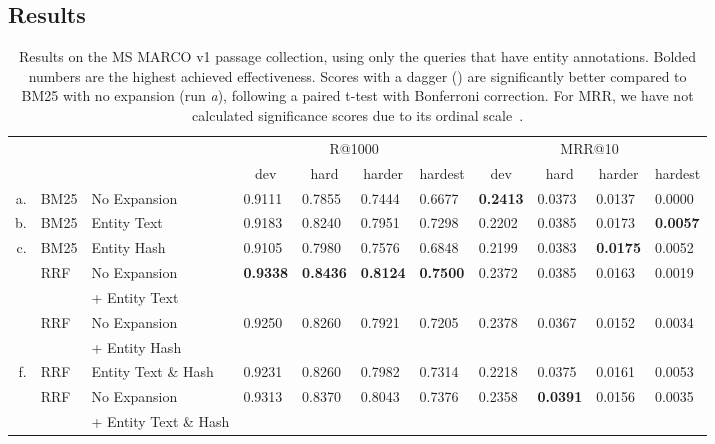 \subsection{Results}
\begin{table}
	\centering
	\caption{Results on the MS MARCO v1 passage collection, using only the queries that have entity annotations. Bolded numbers are the highest achieved effectiveness. Scores with a dagger (\dag) are significantly better compared to BM25 with no expansion (run \emph{a}), following a paired t-test with Bonferroni correction. For MRR, we have not calculated significance scores due to its ordinal scale~\citep{fuhr-mrr}.}
	\tabcolsep=0.11cm
	\begin{tabular}{rll|llll|llll}
		\toprule
		\multirow{2}{*}{}
		& & & \multicolumn{4}{c|}{R@1000} & \multicolumn{4}{c}{MRR@10} \\
		& & & \multicolumn{1}{c}{dev} & \multicolumn{1}{c}{hard} & \multicolumn{1}{c}{harder} & \multicolumn{1}{c|}{hardest} & \multicolumn{1}{c}{dev} & \multicolumn{1}{c}{hard} & \multicolumn{1}{c}{harder} & \multicolumn{1}{c}{hardest} \\
		\midrule
		a. & BM25 & No Expansion                       & 0.9111 & 0.7855 & 0.7444 & 0.6677 & \textbf{0.2413} & 0.0373 & 0.0137 & 0.0000 \\
		b. & BM25 & Entity Text                        & 0.9183 & 0.8240\dag & 0.7951\dag & 0.7298\dag & 0.2202 & 0.0385 & 0.0173 & \textbf{0.0057} \\
		c. & BM25 & Entity Hash                        & 0.9105 & 0.7980 & 0.7576 & 0.6848 & 0.2199 & 0.0383 & \textbf{0.0175} & 0.0052 \\ \midrule
		\multirow{2}{*}{}
		d. & RRF & No Expansion          & \textbf{0.9338}\dag & \textbf{0.8436}\dag & \textbf{0.8124}\dag & \textbf{0.7500}\dag & 0.2372 & 0.0385 & 0.0163 & 0.0019 \\
		& & + Entity Text &&&&&&&& \\
		\multirow{2}{*}{}
		e. & RRF &  No Expansion     & 0.9250\dag & 0.8260\dag & 0.7921\dag & 0.7205\dag & 0.2378 & 0.0367 & 0.0152 & 0.0034 \\
		&&  + Entity Hash  &&&&&&&& \\
		f. & RRF & Entity Text \& Hash                 & 0.9231 & 0.8260\dag & 0.7982\dag & 0.7314\dag & 0.2218 & 0.0375 & 0.0161 & 0.0053 \\
		\multirow{2}{*}{}
		g. & RRF & No Expansion   & 0.9313\dag & 0.8370\dag & 0.8043\dag & 0.7376\dag & 0.2358 & \textbf{0.0391} & 0.0156 & 0.0035 \\
		&& + Entity Text \& Hash &&&&&&&& \\
		\bottomrule 
	\end{tabular}
	\label{tab:results-table}
\end{table}

